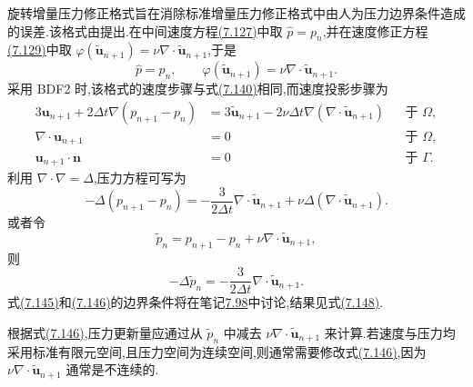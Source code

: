 \begin{example}[旋转增量压力修正格式]\label{ex:rotational-incremental-pressure-correction}
旋转增量压力修正格式旨在消除标准增量压力修正格式中由人为压力边界条件造成的误差.该格式由\textcite{Timmermans1996}提出.在中间速度方程\hyperref[eq:projection-intermediate-velocity]{(7.127)}中取 $\widehat p=p_n$,并在速度修正方程\hyperref[eq:projection-correction-step]{(7.129)}中取 $\varphi(\widetilde{\bm{u}}_{n+1})=\nu\nabla\cdot\widetilde{\bm{u}}_{n+1}$,于是
\[
 \widehat p=p_n,
 \qquad
 \varphi(\widetilde{\bm{u}}_{n+1})
  =\nu\nabla\cdot\widetilde{\bm{u}}_{n+1}.
\]
采用 BDF2 时,该格式的速度步骤与式\hyperref[eq:incremental-pressure-correction-bdf2-velocity]{(7.140)}相同,而速度投影步骤为
\begin{equation}\label{eq:rotational-incremental-pressure-correction}
\begin{aligned}
 3\bm{u}_{n+1}
 +2\Delta t\nabla(p_{n+1}-p_n)
   &=3\widetilde{\bm{u}}_{n+1}
     -2\nu\Delta t\nabla(\nabla\cdot\widetilde{\bm{u}}_{n+1})
       &&\text{于 }\Omega,\\
 \nabla\cdot\bm{u}_{n+1}&=0
       &&\text{于 }\Omega,\\
 \bm{u}_{n+1}\cdot\bm{n}&=0
       &&\text{于 }\Gamma.
\end{aligned}
\end{equation}
利用 $\nabla\cdot\nabla=\Delta$,压力方程可写为
\begin{equation}\label{eq:rotational-incremental-pressure-poisson}
 -\Delta(p_{n+1}-p_n)
 =-\frac{3}{2\Delta t}\nabla\cdot\widetilde{\bm{u}}_{n+1}
  +\nu\Delta(\nabla\cdot\widetilde{\bm{u}}_{n+1}).
\end{equation}
或者令
\[
 \widetilde p_n=p_{n+1}-p_n
    +\nu\nabla\cdot\widetilde{\bm{u}}_{n+1},
\]
则
\begin{equation}\label{eq:rotational-incremental-pressure-poisson-modified}
 -\Delta\widetilde p_n
  =-\frac{3}{2\Delta t}
    \nabla\cdot\widetilde{\bm{u}}_{n+1}.
\end{equation}
式\hyperref[eq:rotational-incremental-pressure-poisson]{(7.145)}和\hyperref[eq:rotational-incremental-pressure-poisson-modified]{(7.146)}的边界条件将在笔记\hyperref[note:rotational-incremental-pressure-correction-properties]{7.98}中讨论,结果见式\hyperref[eq:rotational-pressure-boundary-condition]{(7.148)}.

根据式\hyperref[eq:rotational-incremental-pressure-poisson-modified]{(7.146)},压力更新量应通过从 $\widetilde p_n$ 中减去 $\nu\nabla\cdot\widetilde{\bm{u}}_{n+1}$ 来计算.若速度与压力均采用标准有限元空间,且压力空间为连续空间,则通常需要修改式\hyperref[eq:rotational-incremental-pressure-poisson-modified]{(7.146)},因为 $\nu\nabla\cdot\widetilde{\bm{u}}_{n+1}$ 通常是不连续的.
\end{example}

